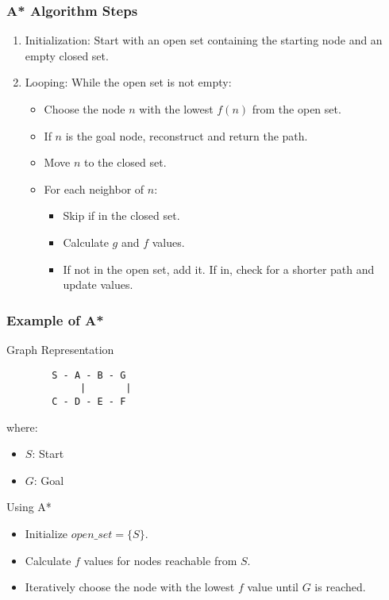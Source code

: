 \documentclass[aspectratio=169]{beamer}
\begin{document}
\begin{frame}[fragile]
    \frametitle{A* Algorithm Steps}
    \begin{enumerate}
        \item Initialization: Start with an open set containing the starting node and an empty closed set.
        \item Looping: While the open set is not empty:
        \begin{itemize}
            \item Choose the node \(n\) with the lowest \(f(n)\) from the open set.
            \item If \(n\) is the goal node, reconstruct and return the path.
            \item Move \(n\) to the closed set.
            \item For each neighbor of \(n\):
            \begin{itemize}
                \item Skip if in the closed set.
                \item Calculate \(g\) and \(f\) values.
                \item If not in the open set, add it. If in, check for a shorter path and update values.
            \end{itemize}
        \end{itemize}
    \end{enumerate}
\end{frame}

\begin{frame}[fragile]
    \frametitle{Example of A*}
    \begin{block}{Graph Representation}
        \begin{verbatim}
        S - A - B - G
             |       |
        C - D - E - F
        \end{verbatim}
        where:
        \begin{itemize}
            \item \(S\): Start
            \item \(G\): Goal
        \end{itemize}
    \end{block}
    \begin{block}{Using A*}
        \begin{itemize}
            \item Initialize \(open\_set = \{S\}\).
            \item Calculate \(f\) values for nodes reachable from \(S\).
            \item Iteratively choose the node with the lowest \(f\) value until \(G\) is reached.
        \end{itemize}
    \end{block}
\end{frame}
\end{document}
